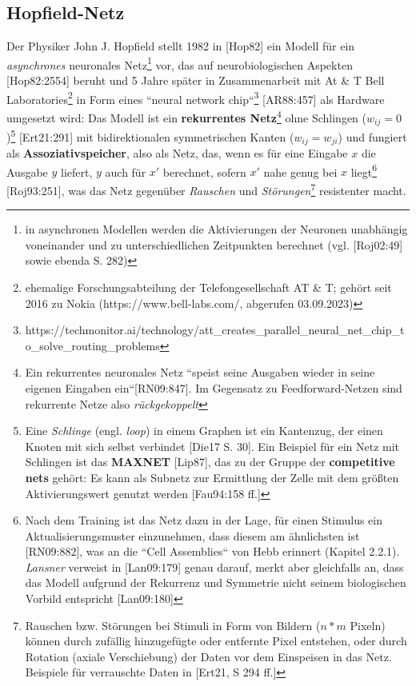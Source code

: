 \subsection{Hopfield-Netz}

Der Physiker John J. Hopfield stellt 1982 in [Hop82] ein Modell für ein \textit{asynchrones} neuronales Netz\footnote{
    in asynchronen Modellen werden die Aktivierungen der Neuronen unabhängig voneinander und zu unterschiedlichen Zeitpunkten berechnet (vgl. [Roj02:49] sowie ebenda S. 282)
}  vor, das auf neurobiologischen Aspekten [Hop82:2554] beruht und 5 Jahre später in Zusammenarbeit mit At & T Bell Laboratories\footnote{
    ehemalige Forschungsabteilung der Telefongesellschaft AT \& T;  gehört seit 2016 zu Nokia (https://www.bell-labs.com/, abgerufen 03.09.2023)
} in Form eines ``neural network chip``\footnote{
    https://techmonitor.ai/technology/att\_creates\_parallel\_neural\_net\_chip\_to\_solve\_routing\_problems
} [AR88:457] als Hardware umgesetzt wird: Das Modell ist ein \textbf{rekurrentes Netz}\footnote{
Ein rekurrentes neuronales Netz ``speist seine Ausgaben wieder in seine eigenen Eingaben ein``[RN09:847]. Im Gegensatz zu Feedforward-Netzen sind rekurrente Netze also \textit{rückgekoppelt}
} ohne Schlingen ($w_{ij} = 0$)\footnote{ Eine \textit{Schlinge} (engl. \textit{loop}) in einem Graphen ist ein Kantenzug, der einen Knoten mit sich selbst verbindet [Die17 S. 30]. Ein Beispiel für ein Netz mit Schlingen ist das \textbf{MAXNET} [Lip87], das zu der Gruppe der \textbf{competitive nets} gehört: Es kann als Subnetz zur Ermittlung der Zelle mit dem größten Aktivierungswert genutzt werden [Fau94:158 ff.]
} [Ert21:291] mit bidirektionalen symmetrischen Kanten ($w_{ij} = w_{ji}$) und fungiert als \textbf{Assoziativspeicher}, also als Netz, das, wenn es für eine Eingabe $x$ die Ausgabe $y$ liefert, $y$ auch für $x'$ berechnet, sofern $x'$ nahe genug bei $x$ liegt\footnote{ Nach dem Training ist das Netz dazu in der Lage, für einen Stimulus ein Aktualisierungsmuster einzunehmen, dass diesem am ähnlichsten ist [RN09:882], was an die ``Cell Assemblies`` von Hebb erinnert (Kapitel 2.2.1). \textit{Lansner} verweist in [Lan09:179] genau darauf, merkt aber gleichfalls an, dass das Modell aufgrund der Rekurrenz und Symmetrie nicht seinem biologischen Vorbild entspricht [Lan09:180]
} [Roj93:251], was das Netz gegenüber \textit{Rauschen} und \textit{Störungen}\footnote{
    Rauschen bzw. Störungen bei Stimuli in Form von Bildern ($n * m$ Pixeln) können durch zufällig hinzugefügte oder entfernte Pixel entstehen, oder durch Rotation (axiale Verschiebung) der Daten vor dem Einspeisen in das Netz. Beispiele für verrauschte Daten in [Ert21, S 294 ff.]
} resistenter macht.
